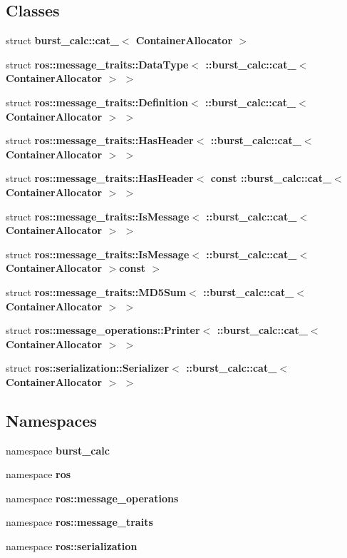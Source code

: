 \subsection*{\-Classes}
\begin{DoxyCompactItemize}
\item 
struct {\bf burst\-\_\-calc\-::cat\-\_\-$<$ Container\-Allocator $>$}
\item 
struct {\bf ros\-::message\-\_\-traits\-::\-Data\-Type$<$ \-::burst\-\_\-calc\-::cat\-\_\-$<$ Container\-Allocator $>$ $>$}
\item 
struct {\bf ros\-::message\-\_\-traits\-::\-Definition$<$ \-::burst\-\_\-calc\-::cat\-\_\-$<$ Container\-Allocator $>$ $>$}
\item 
struct {\bf ros\-::message\-\_\-traits\-::\-Has\-Header$<$ \-::burst\-\_\-calc\-::cat\-\_\-$<$ Container\-Allocator $>$ $>$}
\item 
struct {\bf ros\-::message\-\_\-traits\-::\-Has\-Header$<$ const \-::burst\-\_\-calc\-::cat\-\_\-$<$ Container\-Allocator $>$ $>$}
\item 
struct {\bf ros\-::message\-\_\-traits\-::\-Is\-Message$<$ \-::burst\-\_\-calc\-::cat\-\_\-$<$ Container\-Allocator $>$ $>$}
\item 
struct {\bf ros\-::message\-\_\-traits\-::\-Is\-Message$<$ \-::burst\-\_\-calc\-::cat\-\_\-$<$ Container\-Allocator $>$const  $>$}
\item 
struct {\bf ros\-::message\-\_\-traits\-::\-M\-D5\-Sum$<$ \-::burst\-\_\-calc\-::cat\-\_\-$<$ Container\-Allocator $>$ $>$}
\item 
struct {\bf ros\-::message\-\_\-operations\-::\-Printer$<$ \-::burst\-\_\-calc\-::cat\-\_\-$<$ Container\-Allocator $>$ $>$}
\item 
struct {\bf ros\-::serialization\-::\-Serializer$<$ \-::burst\-\_\-calc\-::cat\-\_\-$<$ Container\-Allocator $>$ $>$}
\end{DoxyCompactItemize}
\subsection*{\-Namespaces}
\begin{DoxyCompactItemize}
\item 
namespace {\bf burst\-\_\-calc}
\item 
namespace {\bf ros}
\item 
namespace {\bf ros\-::message\-\_\-operations}
\item 
namespace {\bf ros\-::message\-\_\-traits}
\item 
namespace {\bf ros\-::serialization}
\end{DoxyCompactItemize}
